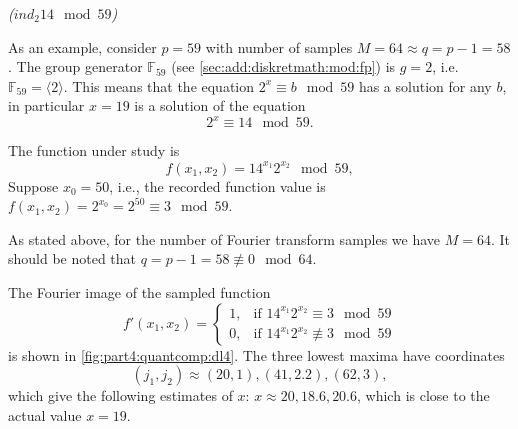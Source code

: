 \begin{example}
\emph{($ind_2{14} \mod{59}$)}

As an example, consider $p = 59$ with number of samples $M = 64
\approx q = p - 1 = 58$. The group generator $\mathbb{F}_{59}$ (see
\autoref{sec:add:diskretmath:mod:fp}) 
is $g = 2$, i.e. $\mathbb{F}_{59} = \langle 2 \rangle$. This
means that the equation $2^x \equiv b \mod 59$ has a solution for
any $b$, in particular $x = 19$ is a solution of the equation
\[
2^x \equiv 14 \mod 59.
\] 

The function under study is
\[
f(x_1, x_2) = 14^{x_1} 2^{x_2} \mod 59,
\]
Suppose $x_0 = 50$, i.e., the recorded function value is
$f(x_1, x_2) = 2^{x_0} = 2^{50} \equiv 3 \mod 59$.



As stated above, for the number of Fourier transform samples we have $M=64$. It should be noted that
$q = p - 1 = 58 \not\equiv 0 \mod 64$.

The Fourier image of the sampled function 
\[
f'(x_1, x_2) = 
\begin{cases}
1, & \text{if } 14^{x_1} 2^{x_2} \equiv 3 \mod 59 \\
0, & \text{if } 14^{x_1} 2^{x_2} \not\equiv 3 \mod 59 
\end{cases}
\]
is shown in \autoref{fig:part4:quantcomp:dl4}. 
The three lowest maxima have coordinates 
\[
(j_1, j_2) \approx (20,1), (41,2.2), (62,3), 
\]
which give the following estimates of $x$: $x \approx 20, 18.6, 20.6$,
which is close to the actual value $x = 19$.
\label{ex:part4:quantcomp:discretlog:periodfinding3}
\end{example}




